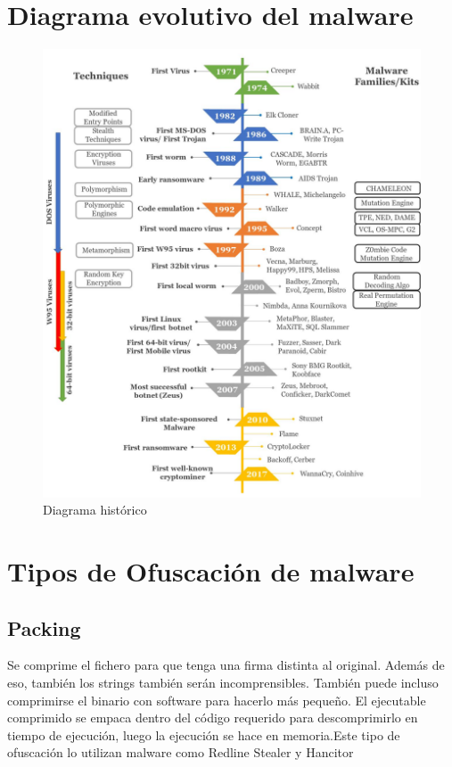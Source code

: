 \documentclass[15pt]{article}
\begin{document}
	
	\newpage
	\section{Diagrama evolutivo del malware}
	
	\begin{figure}[h]
		\centering
		\includegraphics[width=14cm]{images/history.jpeg}
		\caption{Diagrama histórico}
	\end{figure}

	\newpage

	\section{Tipos de Ofuscación de malware}
	\subsection{Packing}
	Se comprime el fichero para que tenga una firma distinta al original. Además de eso, también los strings también serán incomprensibles. También puede incluso comprimirse el binario con software para hacerlo más pequeño. El ejecutable comprimido se empaca dentro del código requerido para descomprimirlo en tiempo de ejecución, luego la ejecución se hace en memoria.Este tipo de ofuscación lo utilizan malware como Redline Stealer \cite{redlinestealer} y Hancitor \cite{hancitor}
	
\end{document}
